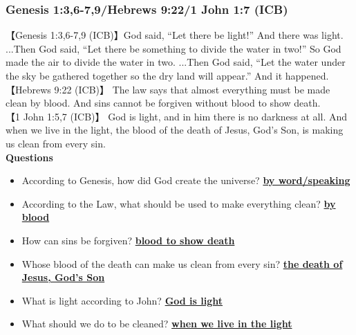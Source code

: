 \subsubsection{\large{Genesis 1:3,6-7,9/Hebrews 9:22/1 John 1:7 (ICB)}}
【Genesis 1:3,6-7,9 (ICB)】God said, “Let there be light!” And there was light. ...Then God said, “Let there be something to divide the water in two!” So God made the air to divide the water in two. ...Then God said, “Let the water under the sky be gathered together so the dry land will appear.” And it happened.\\
【Hebrews 9:22 (ICB)】 The law says that almost everything must be made clean by blood. And sins cannot be forgiven without blood to show death.\\
【1 John 1:5,7 (ICB)】 God is light, and in him there is no darkness at all. And when we live in the light, the blood of the death of Jesus, God’s Son, is making us clean from every sin.\\
\vspace{.25cm}
\textbf{Questions}\vspace{-.5cm}
\begin{itemize}[noitemsep]
\item According to Genesis, how did God create the universe? \textbf{\underline{by word/speaking}}
\item According to the Law, what should be used to make everything clean? \textbf{\underline{by blood}}
\item How can sins be forgiven? \textbf{\underline{blood to show death}}
\item Whose blood of the death can make us clean from every sin? \textbf{\underline{the death of Jesus, God's Son}}
\item What is light according to John? \textbf{\underline{God is light}}
\item What should we do to be cleaned? \textbf{\underline{when we live in the light}}
\end{itemize}

\vspace{.25cm}
